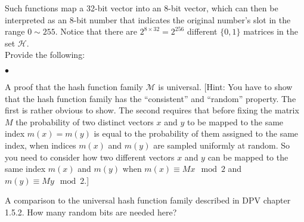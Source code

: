 \documentclass{article}
\newenvironment{myitem}{\begin{list}{$\bullet$}
{\setlength{\itemsep}{-0pt}
\setlength{\topsep}{0pt}
\setlength{\labelwidth}{0pt}
\setlength{\leftmargin}{10pt}
\setlength{\parsep}{-0pt}
\setlength{\itemsep}{0pt}
\setlength{\partopsep}{0pt}}}%
{\end{list}}
\begin{document}
\noindent Such functions map a 32-bit vector into an 8-bit vector,
which can then be interpreted as an 8-bit number that indicates the
original number's slot in the range $0 \sim 255$. Notice that there
are $2^{8\times32}=2^{256}$ different $\{0,1\}$ matrices in the set
$\mathcal{H}$.\\

\noindent Provide the following:
\begin{myitem}
\item A proof that the hash function family $\mathcal{M}$ is
  universal. [Hint: You have to show that the hash function family has
    the ``consistent'' and ``random'' property. The first is rather
    obvious to show. The second requires that before fixing the matrix
    $M$ the probability of two distinct vectors $x$ and $y$ to be
    mapped to the same index $m(x) = m(y)$ is equal to the probability
    of them assigned to the same index, when indices $m(x)$ and $m(y)$
    are sampled uniformly at random. So you need to consider how two
    different vectors $x$ and $y$ can be mapped to the same index
    $m(x)$ and $m(y)$ when $m(x) \equiv Mx \mod 2$ and $m(y) \equiv
    My \mod 2$.]

\item A comparison to the universal hash function family described in
  DPV chapter 1.5.2. How many random bits are needed here?\\
\end{myitem}
\end{document}
